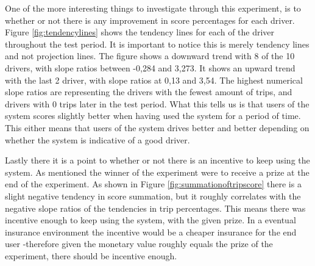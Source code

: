 One of the more interesting things to investigate through this experiment, is to whether or not there is any improvement in score percentages for each driver. Figure \ref{fig:tendencylines} shows the tendency lines for each of the driver throughout the test period. It is important to notice this is merely tendency lines and not projection lines. The figure shows a downward trend with 8 of the 10 drivers, with  slope ratios between -0,284 and 3,273. It shows an upward trend with the last 2 driver, with slope ratios at 0,13 and 3,54. The highest numerical slope ratios are representing the drivers with the fewest amount of trips, and drivers with 0 trips later in the test period. What this tells us is that users of the system scores slightly better when having used the system for a period of time. This either means that users of the system drives better and better depending on whether the system is indicative of a good driver.


Lastly there it is a point to whether or not there is an incentive to keep using the system. As mentioned the winner of the experiment were to receive a prize at the end of the experiment. As shown in Figure \ref{fig:summationoftripscore} there is a slight negative tendency in score summation, but it roughly correlates with the negative slope ratios of the tendencies in trip percentages. This means there was incentive enough to keep using the system, with the given prize. In a eventual insurance environment the incentive would be a cheaper insurance for the end user -therefore given the monetary value roughly equals the prize of the experiment, there should be incentive enough.
 